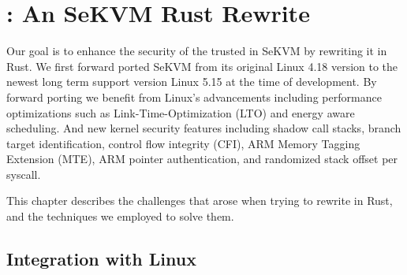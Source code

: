 \chapter{\rustsec{}: An SeKVM Rust Rewrite}
\label{sec:rewrite}


Our goal is to enhance the security of the trusted \secore{} in SeKVM by
rewriting it in Rust. We first forward ported SeKVM from its original
Linux 4.18 version to the newest long term support version Linux 5.15 at the
time of development.
By forward porting we benefit from Linux's advancements including performance
optimizations such as Link-Time-Optimization (LTO) and energy aware scheduling.
And new kernel security features including  shadow call stacks,
branch target identification, control flow integrity (CFI), ARM Memory Tagging
Extension (MTE), ARM pointer authentication, and randomized stack offset per
syscall.


This chapter describes the challenges that arose when trying to rewrite
\secore{} in Rust, and the techniques we employed to solve them.

\section{Integration with Linux}

%


